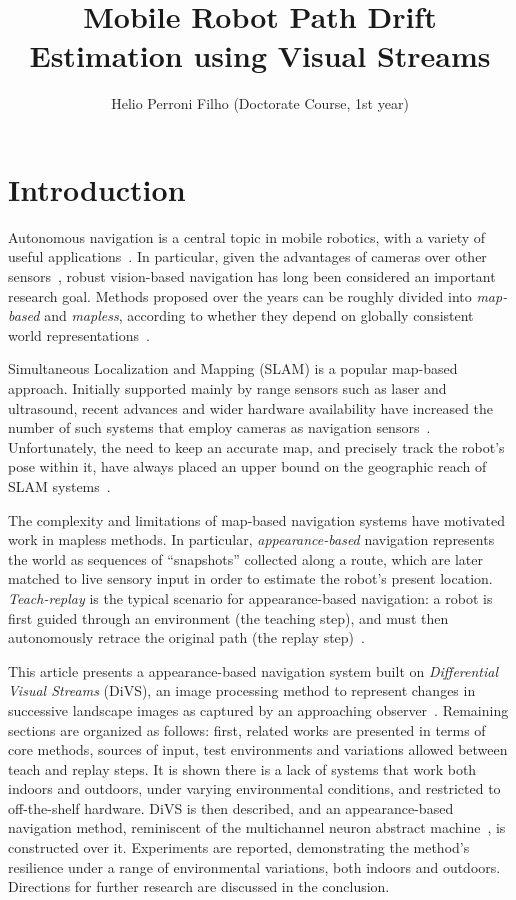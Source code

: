 \documentclass[twocolumn, 9pt,fleqn]{jsproceedings}
\title{Mobile Robot Path Drift Estimation using Visual Streams}
\author{Helio Perroni Filho (Doctorate Course, 1st year)\authorrefmark{1}}
\affiliation{Intelligent Robotics Laboratory, OHYA's group}
\begin{document}
\thispagestyle{myheadings}
\maketitle


\section{Introduction}

Autonomous navigation is a central topic in mobile robotics, with a variety of useful applications~\cite{BON02,ARK90}. In particular, given the advantages of cameras over other sensors~\cite{BON02,DAV07}, robust vision-based navigation has long been considered an important research goal. Methods proposed over the years can be roughly divided into \textit{map-based} and \textit{mapless}, according to whether they depend on globally consistent world representations~\cite{BON02}.

Simultaneous Localization and Mapping (SLAM) is a popular map-based approach. Initially supported mainly by range sensors such as laser and ultrasound, recent advances and wider hardware availability have increased the number of such systems that employ cameras as navigation sensors~\cite{DAV07,CUM08}. Unfortunately, the need to keep an accurate map, and precisely track the robot's pose within it, have always placed an upper bound on the geographic reach of SLAM systems~\cite{CAS04}.

The complexity and limitations of map-based navigation systems have motivated work in mapless methods. In particular, \textit{appearance-based} navigation represents the world as sequences of ``snapshots'' collected along a route, which are later matched to live sensory input in order to estimate the robot's present location. \textit{Teach-replay} is the typical scenario for appearance-based navigation: a robot is first guided through an environment (the teaching step), and must then autonomously retrace the original path (the replay step)~\cite{BUR01}.

This article presents a appearance-based navigation system built on \textit{Differential Visual Streams} (DiVS), an image processing method to represent changes in successive landscape images as captured by an approaching observer~\cite{HEL14a}. Remaining sections are organized as follows: first, related works are presented in terms of core methods, sources of input, test environments and variations allowed between teach and replay steps. It is shown there is a lack of systems that work both indoors and outdoors, under varying environmental conditions, and restricted to off-the-shelf hardware. DiVS is then described, and an appearance-based navigation method, reminiscent of the multichannel neuron abstract machine~\cite{HEL14b}, is constructed over it. Experiments are reported, demonstrating the method's resilience under a range of environmental variations, both indoors and outdoors. Directions for further research are discussed in the conclusion.
\end{document}
